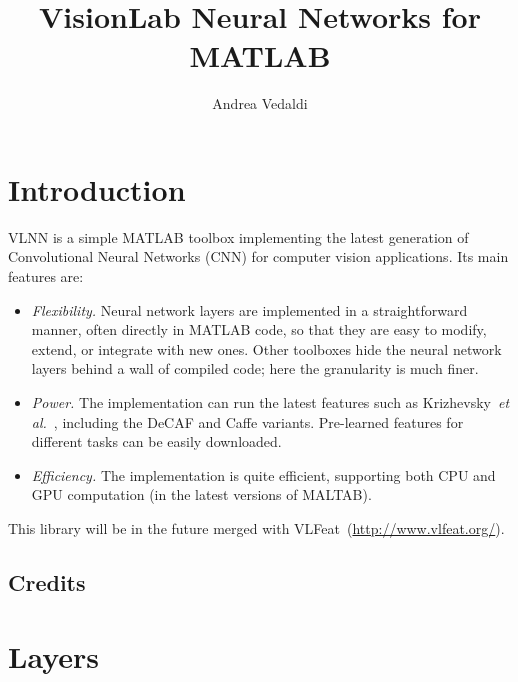 \documentclass[12pt]{article}
\newcommand{\vlnn}{\textsf{VLNN}\xspace}
\begin{document}
\title{VisionLab Neural Networks for MATLAB}
\author{Andrea Vedaldi}

\section{Introduction}

\vlnn is a simple MATLAB toolbox implementing the latest generation of Convolutional Neural Networks (CNN) for computer vision applications. Its main features are:
\begin{itemize}
\item \emph{Flexibility.} Neural network layers are implemented in a straightforward manner, often directly in MATLAB code, so that they are easy to modify, extend, or integrate with new ones. Other toolboxes hide the neural network layers behind a wall of compiled code; here the granularity is much finer.
\item \emph{Power.} The implementation can run the latest features such as Krizhevsky~\textit{et al.}~\cite{krizhevsky12imagenet}, including the DeCAF and Caffe variants. Pre-learned features for different tasks can be easily downloaded.
\item \emph{Efficiency.} The implementation is quite efficient, supporting both CPU and GPU computation (in the latest versions of MALTAB).
\end{itemize}
This library will be in the future merged with VLFeat~(\url{http://www.vlfeat.org/}).

\subsection{Credits}

\section{}

\section{Layers}
\end{document}
